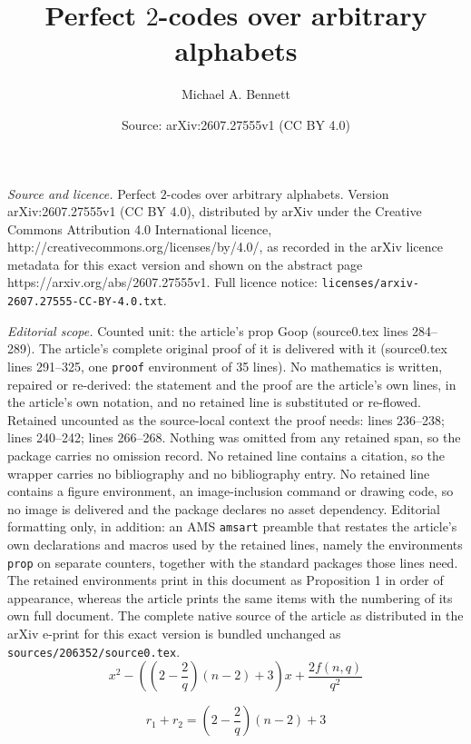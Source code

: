 \documentclass[10pt,a4paper]{amsart}
\title{Perfect $2$-codes over arbitrary alphabets}
\author{Michael A. Bennett}
\date{Source: arXiv:2607.27555v1 (CC BY 4.0)}
\begin{document}
\maketitle

\noindent\emph{Source and licence.} Perfect $2$-codes over arbitrary alphabets. Version arXiv:2607.27555v1 (CC BY 4.0), distributed by arXiv under the Creative Commons Attribution 4.0 International licence, http://creativecommons.org/licenses/by/4.0/, as recorded in the arXiv licence metadata for this exact version and shown on the abstract page https://arxiv.org/abs/2607.27555v1. Full licence notice: \texttt{licenses/arxiv-2607.27555-CC-BY-4.0.txt}.\par\smallskip

\noindent\textit{Editorial scope.} Counted unit: the article's prop Goop (source0.tex lines 284--289). The article's complete original proof of it is delivered with it (source0.tex lines 291--325, one \texttt{proof} environment of 35 lines). No mathematics is written, repaired or re-derived: the statement and the proof are the article's own lines, in the article's own notation, and no retained line is substituted or re-flowed.  Retained uncounted as the source-local context the proof needs: lines 236--238; lines 240--242; lines 266--268.  Nothing was omitted from any retained span, so the package carries no omission record.  No retained line contains a citation, so the wrapper carries no bibliography and no bibliography entry.  No retained line contains a figure environment, an image-inclusion command or drawing code, so no image is delivered and the package declares no asset dependency.  Editorial formatting only, in addition: an AMS \texttt{amsart} preamble that restates the article's own declarations and macros used by the retained lines, namely the environments \texttt{prop} on separate counters, together with the standard packages those lines need.  The retained environments print in this document as Proposition 1 in order of appearance, whereas the article prints the same items with the numbering of its own full document.  The complete native source of the article as distributed in the arXiv e-print for this exact version is bundled unchanged as \texttt{sources/206352/source0.tex}.
\begin{equation} \label{poly}
x^2 - \left( \left( 2 -\frac{2}{q} \right) (n-2) +3 \right)x+\frac{2f(n,q)}{q^2}
\end{equation}

\begin{equation} \label{roots1}
r_1+r_2=\left( 2 -\frac{2}{q} \right) (n-2) +3
\end{equation}
\end{document}
